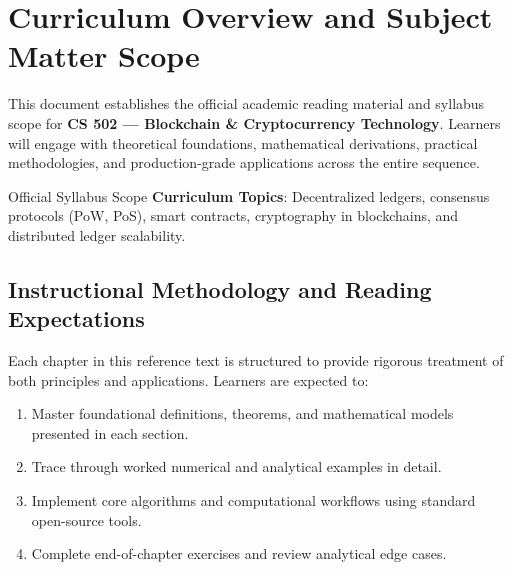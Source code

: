 \section{Curriculum Overview and Subject Matter Scope}

This document establishes the official academic reading material and syllabus scope for \textbf{CS 502 --- Blockchain \& Cryptocurrency Technology}. Learners will engage with theoretical foundations, mathematical derivations, practical methodologies, and production-grade applications across the entire sequence.

\begin{InsightBox}{Official Syllabus Scope}
  \textbf{Curriculum Topics}: Decentralized ledgers, consensus protocols (PoW, PoS), smart contracts, cryptography in blockchains, and distributed ledger scalability.
\end{InsightBox}

\subsection{Instructional Methodology and Reading Expectations}

Each chapter in this reference text is structured to provide rigorous treatment of both principles and applications. Learners are expected to:
\begin{enumerate}
  \item Master foundational definitions, theorems, and mathematical models presented in each section.
  \item Trace through worked numerical and analytical examples in detail.
  \item Implement core algorithms and computational workflows using standard open-source tools.
  \item Complete end-of-chapter exercises and review analytical edge cases.
\end{enumerate}

